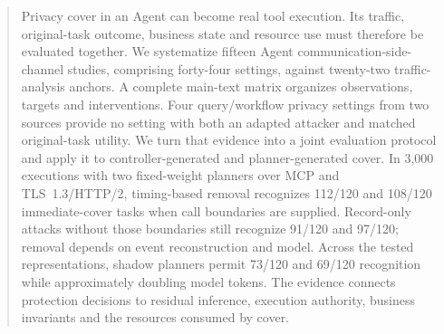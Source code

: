 \begin{abstract}
Privacy cover in an Agent can become real tool execution. Its traffic, original-task outcome, business state and resource use must therefore be evaluated together. We systematize fifteen Agent communication-side-channel studies, comprising forty-four settings, against twenty-two traffic-analysis anchors. A complete main-text matrix organizes observations, targets and interventions. Four query/workflow privacy settings from two sources provide no setting with both an adapted attacker and matched original-task utility. We turn that evidence into a joint evaluation protocol and apply it to controller-generated and planner-generated cover. In 3,000 executions with two fixed-weight planners over MCP and TLS~1.3/HTTP/2, timing-based removal recognizes 112/120 and 108/120 immediate-cover tasks when call boundaries are supplied. Record-only attacks without those boundaries still recognize 91/120 and 97/120; removal depends on event reconstruction and model. Across the tested representations, shadow planners permit 73/120 and 69/120 recognition while approximately doubling model tokens. The evidence connects protection decisions to residual inference, execution authority, business invariants and the resources consumed by cover.
\end{abstract}
